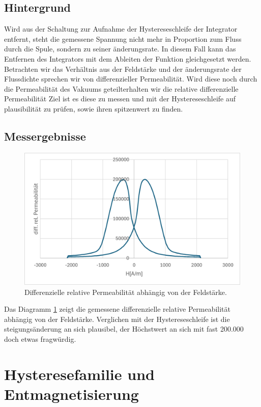 \documentclass[a4paper,twoside,12pt,DIV=13,BCOR=5mm,numbers=noenddot,cleardoublepage=empty]{scrbook}
\begin{document}
\subsection{Hintergrund}
Wird aus der Schaltung zur Aufnahme der Hystereseschleife der Integrator entfernt, steht die gemessene Spannung nicht mehr in Proportion 
zum Fluss durch die Spule, sondern zu seiner \"anderungsrate. In diesem Fall kann das Entfernen des Integrators mit dem Ableiten der Funktion
gleichgesetzt werden. Betrachten wir das Verh\"altnis aus der Feldst\"arke und der \"anderungsrate der Flussdichte sprechen wir von 
differenzieller Permeabilit\"at. Wird diese noch durch die Permeabilit\"at des Vakuums geteilterhalten wir die relative differenzielle Permeabilit\"at Ziel ist es diese zu messen 
und mit der Hystereseschleife auf plausibilit\"at zu pr\"ufen, sowie ihren spitzenwert zu finden.
\subsection{Messergebnisse}
\begin{figure}
  \includegraphics[width=\linewidth]{pictures/Permeabilitaet.png}
  \caption{Differenzielle relative Permeabilit\"at abh\"angig von der Feldst\"arke.}
  \label{fig:perm}
\end{figure}
Das Diagramm \ref{fig:perm} zeigt die gemessene differenzielle relative Permeabilit\"at abh\"angig von der Feldst\"arke. Verglichen mit der Hystereseschleife ist die steigungs\"anderung an sich plausibel, der H\"ochstwert an sich mit fast 200.000 doch etwas fragw\"urdig.

\section{Hysteresefamilie und Entmagnetisierung}
\label{Entmag}
\end{document}
